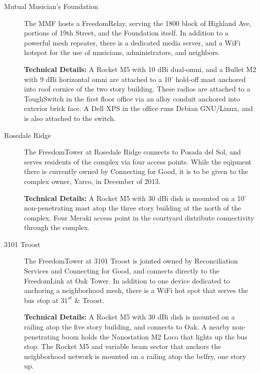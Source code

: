 \begin{description}
\item[Mutual Musician's Foundation] The MMF hosts a FreedomRelay, serving the
1800 block of Highland Ave, portions of 19th Street, and the Foundation itself.
In addition to a powerful mesh repeater, there is a dedicated media server, and a WiFi hotspot for the use
of musicians, administrators, and neighbors. \par
{\bf Technical Details:} A Rocket M5 with 10 dBi dual-omni, and a Bullet M2 with
9 dBi horizontal omni are attached to a 10'
hold-off mast anchored into roof cornice of the two story building. These radios
are attached to a ToughSwitch in the
first floor office via an alloy conduit anchored into exterior brick face. A
Dell XPS in the office runs Debian GNU/Linux, and is also attached to the
switch. 

\item[Rosedale Ridge]
The FreedomTower at Rosedale Ridge connects to Posada del Sol, and serves
residents of the complex via four access points. While the eqipment there is currently owned
by Connecting for Good, it is to be given to the complex owner, Yarco,
in December of 2013. \par
{\bf Technical Details:} A Rocket M5 with 30 dBi dish is mounted on a 10'
non-penetrating mast atop the three story building at the north of the complex.
Four Meraki access point in the courtyard distribute connectivity through the
complex.

\item[3101 Troost] The FreedomTower at 3101 Troost is jointed owned by
Reconciliation Services and Connecting for Good, and connects directly to the
FreedomLink at Oak Tower. In addition to one device dedicated to anchoring a
neighborhood mesh, there is a WiFi hot spot that serves the bus stop at
$31^{st}$ \& Troost. \par
{\bf Technical Details:} A Rocket M5 with 30 dBi dish is mounted on a railing
atop the five story building, and connects to Oak. A nearby non-penetrating boom
holds the Nanostation M2 Loco that lights up the bus stop. The Rocket M5 and
variable beam sector
that anchors the neighborhood network is mounted on a railing atop the belfry, one story up. 
\end{description}

